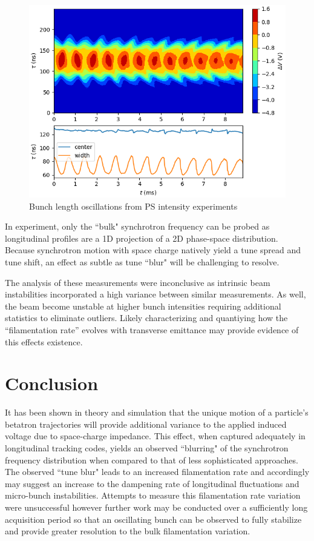 \begin{figure}
    \centering
    \includegraphics{figs/injosc.14x144.dat.npy.png}
    \caption{Bunch length oscillations from PS intensity experiments}
\end{figure}

In experiment, only the ``bulk" synchrotron frequency can be probed as longitudinal profiles are a 1D projection of a 2D phase-space distribution. Because synchrotron motion with space charge natively yield a tune spread and tune shift,  an effect as subtle as tune ``blur" will be challenging to resolve.

The analysis of these measurements were inconclusive as intrinsic beam instabilities incorporated a high variance between similar measurements. As well, the beam become unstable at higher bunch intensities requiring additional statistics to eliminate outliers. Likely characterizing and quantiying how the ``filamentation rate'' evolves with transverse emittance may provide evidence of this effects existence.

\section{Conclusion}

It has been shown in theory and simulation that the unique motion of a particle's betatron trajectories will provide additional variance to the applied induced voltage due to space-charge impedance. This effect, when captured adequately in longitudinal tracking codes, yields an observed ``blurring" of the synchrotron frequency distribution when compared to that of less sophisticated approaches. The observed ``tune blur" leads to an increased filamentation rate and accordingly may suggest an increase to the dampening rate of longitudinal fluctuations and micro-bunch instabilities. Attempts to measure this filamentation rate variation were unsuccessful however further work may be conducted over a sufficiently long acquisition period so that an oscillating bunch can be observed to fully stabilize and provide greater resolution to the bulk filamentation variation.